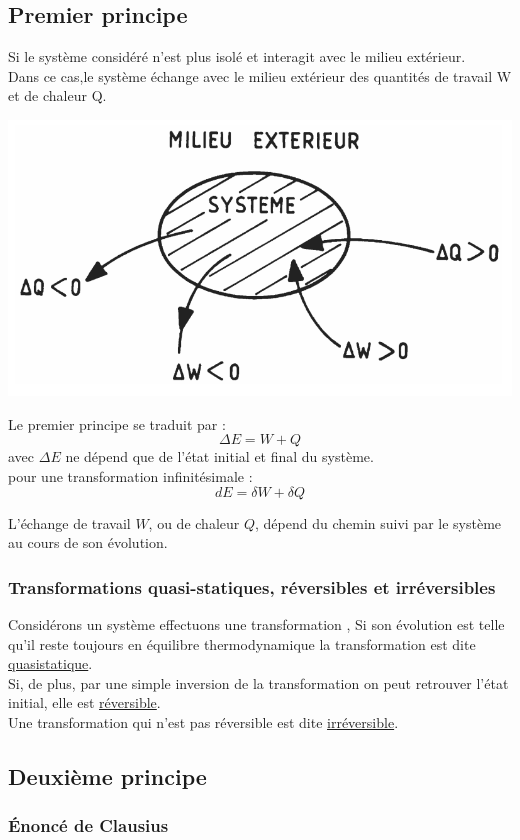 \documentclass[12pt,oneside]{book}
\begin{document}
\subsection{Premier principe}
\begin{center}\end{center}

Si le système considéré n'est plus isolé et interagit avec le milieu extérieur.\\
Dans ce cas,le système échange avec le milieu extérieur des quantités de travail W et de chaleur Q.
\begin{center}
	\includegraphics[width=0.4\linewidth]{../pic/3306/1.png}
\end{center}

Le premier principe se traduit par :
\[ \boxed{\Delta E = W + Q} \]
avec $\Delta E$ ne dépend que de l'état initial et final du système.\\
pour une transformation infinitésimale :
\[dE = \delta W + \delta Q\]

L'échange de travail $W$, ou de chaleur $Q$, dépend du chemin suivi par le système au cours de son évolution.
\subsubsection{Transformations quasi-statiques, réversibles et irréversibles}
Considérons un système effectuons une transformation , Si son évolution est telle qu'il reste toujours en équilibre thermodynamique la transformation est dite \underline{quasistatique}.\\
Si, de plus, par une simple inversion de la transformation on peut retrouver l'état initial, elle est \underline{réversible}.\\
Une transformation qui n'est pas réversible est dite \underline{irréversible}.
\subsection{Deuxième principe }
\subsubsection{Énoncé de Clausius}
\begin{center}\end{center}
\end{document}
